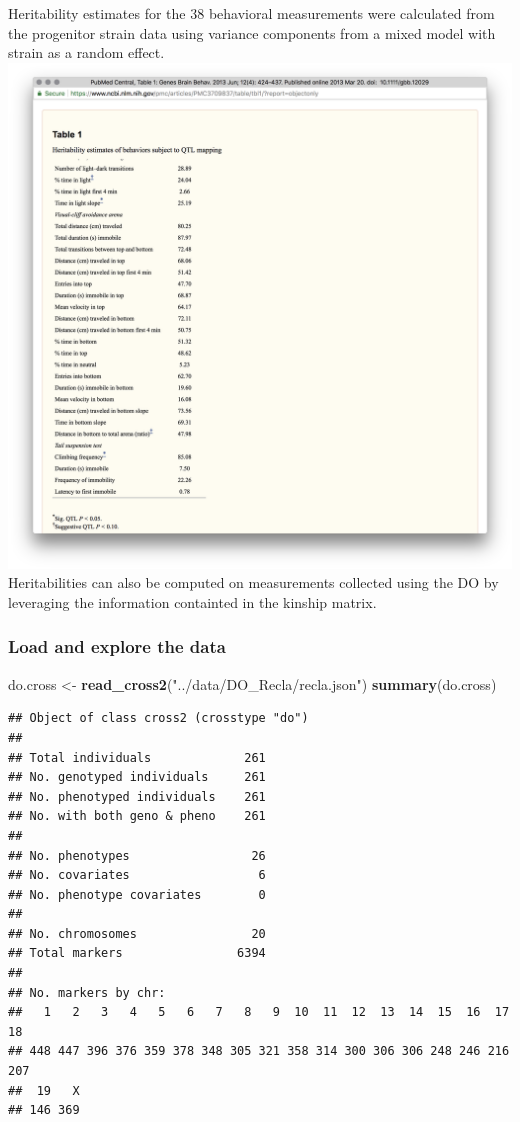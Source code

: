 \documentclass[]{article}
\newenvironment{Shaded}{\begin{snugshade}}{\end{snugshade}}
\newcommand{\KeywordTok}[1]{\textcolor[rgb]{0.13,0.29,0.53}{\textbf{#1}}}
\newcommand{\StringTok}[1]{\textcolor[rgb]{0.31,0.60,0.02}{#1}}
\newcommand{\NormalTok}[1]{#1}
\begin{document}
Heritability estimates for the 38 behavioral measurements were
calculated from the progenitor strain data using variance components
from a mixed model with strain as a random effect.
\includegraphics{../figs/Table1_h2.png} Heritabilities can also be
computed on measurements collected using the DO by leveraging the
information containted in the kinship matrix.

\subsubsection{Load and explore the
data}\label{load-and-explore-the-data}

\begin{Shaded}
\begin{Highlighting}[]
\NormalTok{do.cross <-}\StringTok{ }\KeywordTok{read_cross2}\NormalTok{(}\StringTok{"../data/DO_Recla/recla.json"}\NormalTok{)}
\KeywordTok{summary}\NormalTok{(do.cross)}
\end{Highlighting}
\end{Shaded}

\begin{verbatim}
## Object of class cross2 (crosstype "do")
## 
## Total individuals             261
## No. genotyped individuals     261
## No. phenotyped individuals    261
## No. with both geno & pheno    261
## 
## No. phenotypes                 26
## No. covariates                  6
## No. phenotype covariates        0
## 
## No. chromosomes                20
## Total markers                6394
## 
## No. markers by chr:
##   1   2   3   4   5   6   7   8   9  10  11  12  13  14  15  16  17  18 
## 448 447 396 376 359 378 348 305 321 358 314 300 306 306 248 246 216 207 
##  19   X 
## 146 369
\end{verbatim}
\end{document}
